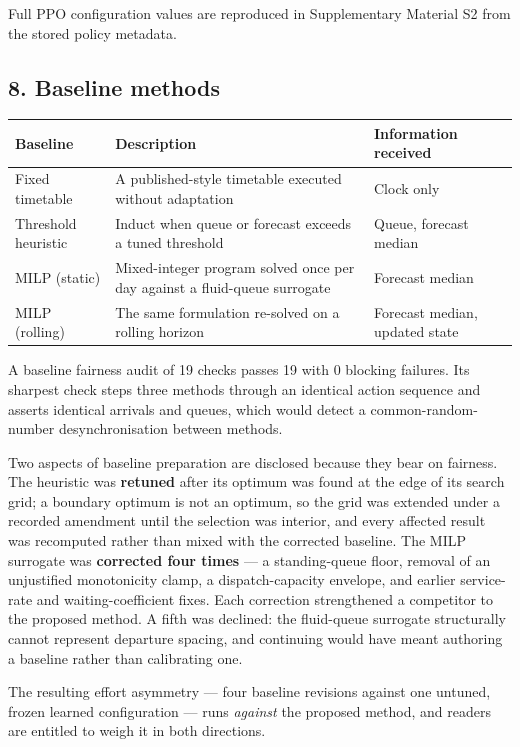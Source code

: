 \documentclass[
]{article}
\begin{document}
Full PPO configuration values are reproduced in Supplementary Material
S2 from the stored policy metadata.

\subsection{8. Baseline methods}\label{8-baseline-methods}

\begin{longtable}[]{@{}lll@{}}
\toprule\noalign{}
Baseline & Description & Information received \\
\midrule\noalign{}
\endhead
\bottomrule\noalign{}
\endlastfoot
Fixed timetable & A published-style timetable executed without
adaptation & Clock only \\
Threshold heuristic & Induct when queue or forecast exceeds a tuned
threshold & Queue, forecast median \\
MILP (static) & Mixed-integer program solved once per day against a
fluid-queue surrogate & Forecast median \\
MILP (rolling) & The same formulation re-solved on a rolling horizon &
Forecast median, updated state \\
\end{longtable}

A baseline fairness audit of 19 checks passes 19 with 0 blocking
failures. Its sharpest check steps three methods through an identical
action sequence and asserts identical arrivals and queues, which would
detect a common-random-number desynchronisation between methods.

Two aspects of baseline preparation are disclosed because they bear on
fairness. The heuristic was \textbf{retuned} after its optimum was found
at the edge of its search grid; a boundary optimum is not an optimum, so
the grid was extended under a recorded amendment until the selection was
interior, and every affected result was recomputed rather than mixed
with the corrected baseline. The MILP surrogate was \textbf{corrected
four times} --- a standing-queue floor, removal of an unjustified
monotonicity clamp, a dispatch-capacity envelope, and earlier
service-rate and waiting-coefficient fixes. Each correction strengthened
a competitor to the proposed method. A fifth was declined: the
fluid-queue surrogate structurally cannot represent departure spacing,
and continuing would have meant authoring a baseline rather than
calibrating one.

The resulting effort asymmetry --- four baseline revisions against one
untuned, frozen learned configuration --- runs \emph{against} the
proposed method, and readers are entitled to weigh it in both
directions.
\end{document}
